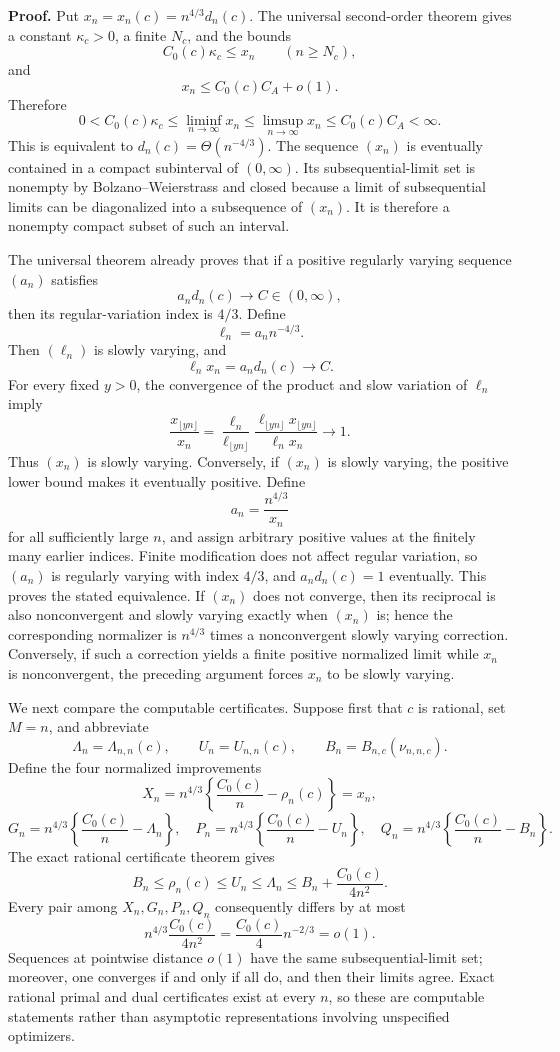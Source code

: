 \textbf{Proof.}
Put \(x_n=x_n(c)=n^{4/3}d_n(c)\).  The universal second-order theorem gives a constant \(\kappa_c>0\), a finite \(N_c\), and the bounds
\[
 C_0(c)\kappa_c\leq x_n
 \qquad(n\geq N_c),
\]
and
\[
 x_n\leq C_0(c)C_A+o(1).
\]
Therefore
\[
 0<C_0(c)\kappa_c
 \leq\liminf_{n\to\infty}x_n
 \leq\limsup_{n\to\infty}x_n
 \leq C_0(c)C_A<\infty.
\]
This is equivalent to \(d_n(c)=\Theta(n^{-4/3})\).  The sequence \((x_n)\) is eventually contained in a compact subinterval of \((0,\infty)\).  Its subsequential-limit set is nonempty by Bolzano--Weierstrass and closed because a limit of subsequential limits can be diagonalized into a subsequence of \((x_n)\).  It is therefore a nonempty compact subset of such an interval.

The universal theorem already proves that if a positive regularly varying sequence \((a_n)\) satisfies
\[
 a_nd_n(c)\longrightarrow C\in(0,\infty),
\]
then its regular-variation index is \(4/3\).  Define
\[
 \ell_n=a_nn^{-4/3}.
\]
Then \((\ell_n)\) is slowly varying, and
\[
 \ell_nx_n=a_nd_n(c)\longrightarrow C.
\]
For every fixed \(y>0\), the convergence of the product and slow variation of \(\ell_n\) imply
\[
 \frac{x_{\lfloor yn\rfloor}}{x_n}
 =\frac{\ell_n}{\ell_{\lfloor yn\rfloor}}
 \frac{\ell_{\lfloor yn\rfloor}x_{\lfloor yn\rfloor}}{\ell_nx_n}
 \longrightarrow1.
\]
Thus \((x_n)\) is slowly varying.  Conversely, if \((x_n)\) is slowly varying, the positive lower bound makes it eventually positive.  Define
\[
 a_n=\frac{n^{4/3}}{x_n}
\]
for all sufficiently large \(n\), and assign arbitrary positive values at the finitely many earlier indices.  Finite modification does not affect regular variation, so \((a_n)\) is regularly varying with index \(4/3\), and \(a_nd_n(c)=1\) eventually.  This proves the stated equivalence.  If \((x_n)\) does not converge, then its reciprocal is also nonconvergent and slowly varying exactly when \((x_n)\) is; hence the corresponding normalizer is \(n^{4/3}\) times a nonconvergent slowly varying correction.  Conversely, if such a correction yields a finite positive normalized limit while \(x_n\) is nonconvergent, the preceding argument forces \(x_n\) to be slowly varying.

We next compare the computable certificates.  Suppose first that \(c\) is rational, set \(M=n\), and abbreviate
\[
 \Lambda_n=\Lambda_{n,n}(c),
 \qquad U_n=U_{n,n}(c),
 \qquad B_n=B_{n,c}(\nu_{n,n,c}).
\]
Define the four normalized improvements
\[
 X_n=n^{4/3}\left\{\frac{C_0(c)}n-\rho_n(c)\right\}=x_n,
\]
\[
 G_n=n^{4/3}\left\{\frac{C_0(c)}n-\Lambda_n\right\},
 \quad
 P_n=n^{4/3}\left\{\frac{C_0(c)}n-U_n\right\},
 \quad
 Q_n=n^{4/3}\left\{\frac{C_0(c)}n-B_n\right\}.
\]
The exact rational certificate theorem gives
\[
 B_n\leq\rho_n(c)\leq U_n\leq\Lambda_n
 \leq B_n+\frac{C_0(c)}{4n^2}.
\]
Every pair among \(X_n,G_n,P_n,Q_n\) consequently differs by at most
\[
 n^{4/3}\frac{C_0(c)}{4n^2}
 =\frac{C_0(c)}4n^{-2/3}=o(1).
\]
Sequences at pointwise distance \(o(1)\) have the same subsequential-limit set; moreover, one converges if and only if all do, and then their limits agree.  Exact rational primal and dual certificates exist at every \(n\), so these are computable statements rather than asymptotic representations involving unspecified optimizers.

